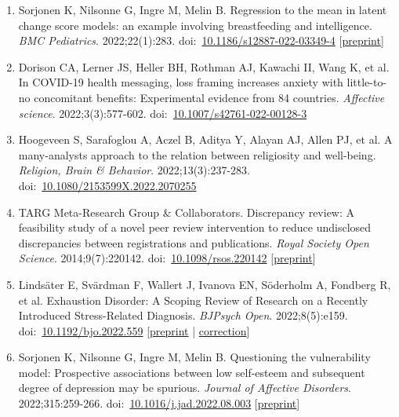 \documentclass[10pt,a4paper,twocolumn]{article}
\begin{document}
\begin{enumerate}
    \item Sorjonen K, Nilsonne G, Ingre M, Melin B. Regression to the mean in latent change score models: an example involving breastfeeding and intelligence. \textit{BMC Pediatrics}. 2022;22(1):283. doi:~\href{https://doi.org/10.1186/s12887-022-03349-4}{10.1186/s12887-022-03349-4} [\href{https://doi.org/10.31234/osf.io/v6a7j}{preprint}]

    \item Dorison CA, Lerner JS, Heller BH, Rothman AJ, Kawachi II, Wang K, et al. In COVID-19 health messaging, loss framing increases anxiety with little-to-no concomitant benefits: Experimental evidence from 84 countries. \textit{Affective science}. 2022;3(3):577-602. doi:~\href{https://doi.org/10.1007/s42761-022-00128-3}{10.1007/s42761-022-00128-3}

    \item Hoogeveen S, Sarafoglou A, Aczel B, Aditya Y, Alayan AJ, Allen PJ, et al. A many-analysts approach to the relation between religiosity and well-being. \textit{Religion, Brain \& Behavior}. 2022;13(3):237-283. doi:~\href{https://doi.org/10.1080/2153599X.2022.2070255}{10.1080/2153599X.2022.2070255}

    \item TARG Meta-Research Group \& Collaborators. Discrepancy review: A feasibility study of a novel peer review intervention to reduce undisclosed discrepancies between registrations and publications. \textit{Royal Society Open Science}. 2014;9(7):220142. doi:~\href{https://doi.org/10.1098/rsos.220142}{10.1098/rsos.220142} [\href{https://doi.org/10.1101/2022.01.18.22269507}{preprint}]

    \item Lindsäter E, Svärdman F, Wallert J, Ivanova EN, Söderholm A, Fondberg R, et al. Exhaustion Disorder: A Scoping Review of Research on a Recently Introduced Stress-Related Diagnosis. \textit{BJPsych Open}. 2022;8(5):e159. doi:~\href{https://doi.org/10.1192/bjo.2022.559}{10.1192/bjo.2022.559} [\href{https://doi.org/10.31234/osf.io/m4w9x}{preprint} | \href{https://doi.org/10.1192/bjo.2022.581}{correction}]

    \item Sorjonen K, Nilsonne G, Ingre M, Melin B. Questioning the vulnerability model: Prospective associations between low self-esteem and subsequent degree of depression may be spurious. \textit{Journal of Affective Disorders}. 2022;315:259-266. doi:~\href{https://doi.org/10.1016/j.jad.2022.08.003}{10.1016/j.jad.2022.08.003} [\href{https://doi.org/10.31234/osf.io/4kcma}{preprint}]


\end{enumerate}
\end{document}
